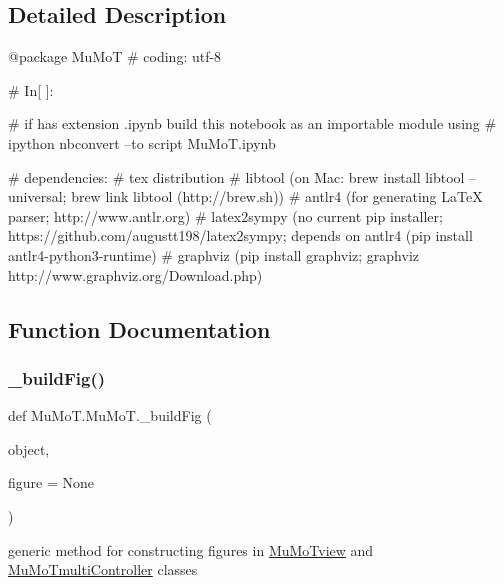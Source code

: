 \subsection{Detailed Description}
\begin{DoxyVerb}@package MuMoT
# coding: utf-8

# In[ ]:

# if has extension .ipynb build this notebook as an importable module using
# ipython nbconvert --to script MuMoT.ipynb

# dependencies:
#  tex distribution
#  libtool (on Mac: brew install libtool --universal; brew link libtool (http://brew.sh))
#  antlr4 (for generating LaTeX parser; http://www.antlr.org)
#  latex2sympy (no current pip installer; https://github.com/augustt198/latex2sympy; depends on antlr4 (pip install antlr4-python3-runtime)
#  graphviz (pip install graphviz; graphviz http://www.graphviz.org/Download.php)
\end{DoxyVerb}
 

\subsection{Function Documentation}
\mbox{\label{namespace_mu_mo_t_1_1_mu_mo_t_aada27c31be7a76cff44cfae711dcfec1}} 
\subsubsection{\texorpdfstring{\+\_\+build\+Fig()}{\_buildFig()}}
{\footnotesize\ttfamily def Mu\+Mo\+T.\+Mu\+Mo\+T.\+\_\+build\+Fig (\begin{DoxyParamCaption}\item[{}]{object,  }\item[{}]{figure = {\ttfamily None} }\end{DoxyParamCaption})\hspace{0.3cm}{\ttfamily [private]}}



generic method for constructing figures in \hyperlink{class_mu_mo_t_1_1_mu_mo_t_1_1_mu_mo_tview}{Mu\+Mo\+Tview} and \hyperlink{class_mu_mo_t_1_1_mu_mo_t_1_1_mu_mo_tmulti_controller}{Mu\+Mo\+Tmulti\+Controller} classes 

\mbox{\label{namespace_mu_mo_t_1_1_mu_mo_t_ac34bd5f10896d28b40c1eaaaab1dd66f}} 

